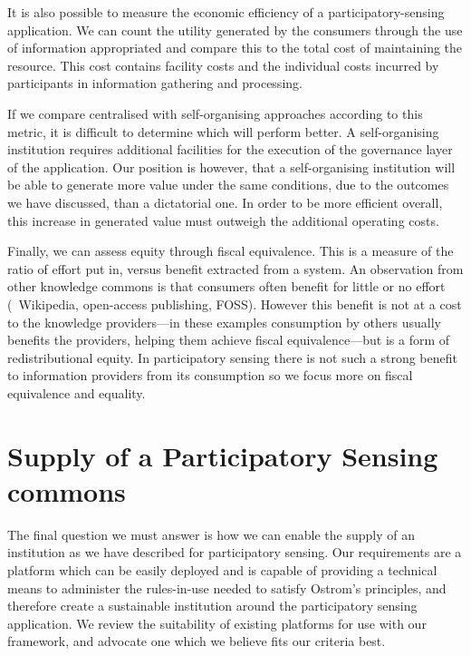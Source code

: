 It is also possible to measure the economic efficiency of a participatory-sensing application. We can count the utility generated by the consumers through the use of information appropriated and compare this to the total cost of maintaining the resource. This cost contains facility costs and the individual costs incurred by participants in information gathering and processing.

If we compare centralised with self-organising approaches according to this metric, it is difficult to determine which will perform better. 
A self-organising institution requires additional facilities for the execution of the governance layer of the application. 
Our position is however, that a self-organising institution will be able to generate more value under the same conditions, due to the outcomes we have discussed, than a dictatorial one. 
In order to be more efficient overall, this increase in generated value must outweigh the additional operating costs.

Finally, we can assess equity through fiscal equivalence. 
This is a measure of the ratio of effort put in, versus benefit extracted from a system. 
An observation from other knowledge commons is that consumers often benefit for little or no effort (\eg\ Wikipedia, open-access publishing, FOSS). However this benefit is not at a cost to the knowledge providers---in these examples consumption by others usually benefits the providers, helping them achieve fiscal equivalence---but is a form of redistributional equity. In participatory sensing there is not such a strong benefit to information providers from its consumption so we focus more on fiscal equivalence and equality.

\section{Supply of a Participatory Sensing commons}


The final question we must answer is how we can enable the supply of an institution as we have described for participatory sensing. 
Our requirements are a platform which can be easily deployed and is capable of providing a technical means to administer the rules-in-use needed to satisfy Ostrom's principles, and therefore create a sustainable institution around the participatory sensing application. 
We review the suitability of existing platforms for use with our framework, and advocate one which we believe fits our criteria best.


